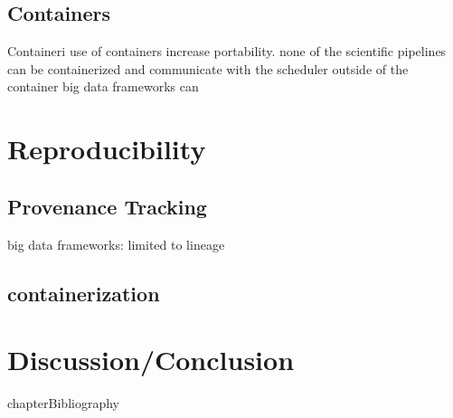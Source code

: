 \documentclass{report}
\begin{document}
        \section{Containers}

             Containeri
            use of containers increase portability. none of the scientific 
            pipelines can be containerized and communicate with the scheduler 
            outside of the container
            big data frameworks can
    \chapter{Reproducibility}\label{reproducibility}
        \section{Provenance Tracking}
        big data frameworks: limited to lineage
        \section{containerization}
    \chapter{Discussion/Conclusion}


        {chapter}{Bibliography} 
        
        
\end{document}
